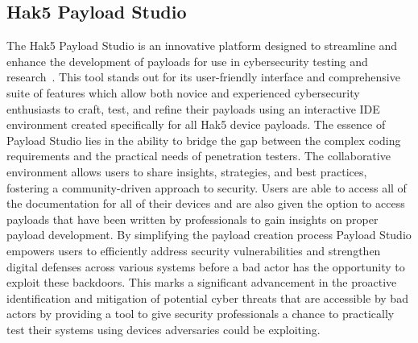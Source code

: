 \documentclass[manuscript,acmsmall,anonymous,review,screen,nonacm=true, authorversion=true]{acmart}
\begin{document}
\subsection{Hak5 Payload Studio}
The Hak5 Payload Studio is an innovative platform designed to streamline and enhance
the development of payloads for use in cybersecurity testing and research~\cite{hakp}. This tool stands out
for its user-friendly interface and comprehensive suite of features which allow both novice and
experienced cybersecurity enthusiasts to craft, test, and refine their payloads using an interactive
IDE environment created specifically for all Hak5 device payloads. The essence of Payload 
Studio lies in the ability to bridge the gap between the complex coding requirements and the
practical needs of penetration testers. The collaborative environment allows users to share
insights, strategies, and best practices, fostering a community-driven approach to security.
Users are able to access all of the documentation for all of their devices and are also given the
option to access payloads that have been written by professionals to gain insights on proper
payload development. By simplifying the payload creation process Payload Studio empowers
users to efficiently address security vulnerabilities and strengthen digital defenses across various
systems before a bad actor has the opportunity to exploit these backdoors. This marks a
significant advancement in the proactive identification and mitigation of potential cyber threats
that are accessible by bad actors by providing a tool to give security professionals a chance to
practically test their systems using devices adversaries could be exploiting.
\end{document}
